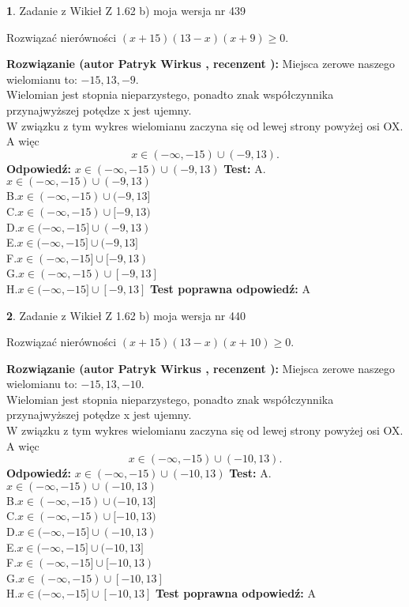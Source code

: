 \documentclass[12pt, a4paper]{article}
\theoremstyle{definition} %
\newtheorem{zad}{}
\newcommand{\zadStart}[1]{\begin{zad}#1\newline}
\newcommand{\zadStop}{\end{zad}}
\newcommand{\rozwStart}[2]{\noindent \textbf{Rozwiązanie (autor #1 , recenzent #2): }\newline}
\newcommand{\rozwStop}{\newline}
\newcommand{\odpStart}{\noindent \textbf{Odpowiedź:}\newline}
\newcommand{\odpStop}{\newline}
\newcommand{\testStart}{\noindent \textbf{Test:}\newline}
\newcommand{\testStop}{\newline}
\newcommand{\kluczStart}{\noindent \textbf{Test poprawna odpowiedź:}\newline}
\newcommand{\kluczStop}{\newline}
\begin{document}
\zadStart{Zadanie z Wikieł Z 1.62 b) moja wersja nr 439}

Rozwiązać nierówności $(x+15)(13-x)(x+9)\ge0$.
\zadStop
\rozwStart{Patryk Wirkus}{}
Miejsca zerowe naszego wielomianu to: $-15, 13, -9$.\\
Wielomian jest stopnia nieparzystego, ponadto znak współczynnika przy\linebreak najwyższej potędze x jest ujemny.\\ W związku z tym wykres wielomianu zaczyna się od lewej strony powyżej osi OX. A więc $$x \in (-\infty,-15) \cup (-9,13).$$
\rozwStop
\odpStart
$x \in (-\infty,-15) \cup (-9,13)$
\odpStop
\testStart
A.$x \in (-\infty,-15) \cup (-9,13)$\\
B.$x \in (-\infty,-15) \cup (-9,13]$\\
C.$x \in (-\infty,-15) \cup [-9,13)$\\
D.$x \in (-\infty,-15] \cup (-9,13)$\\
E.$x \in (-\infty,-15] \cup (-9,13]$\\
F.$x \in (-\infty,-15] \cup [-9,13)$\\
G.$x \in (-\infty,-15) \cup [-9,13]$\\
H.$x \in (-\infty,-15] \cup [-9,13]$
\testStop
\kluczStart
A
\kluczStop



\zadStart{Zadanie z Wikieł Z 1.62 b) moja wersja nr 440}

Rozwiązać nierówności $(x+15)(13-x)(x+10)\ge0$.
\zadStop
\rozwStart{Patryk Wirkus}{}
Miejsca zerowe naszego wielomianu to: $-15, 13, -10$.\\
Wielomian jest stopnia nieparzystego, ponadto znak współczynnika przy\linebreak najwyższej potędze x jest ujemny.\\ W związku z tym wykres wielomianu zaczyna się od lewej strony powyżej osi OX. A więc $$x \in (-\infty,-15) \cup (-10,13).$$
\rozwStop
\odpStart
$x \in (-\infty,-15) \cup (-10,13)$
\odpStop
\testStart
A.$x \in (-\infty,-15) \cup (-10,13)$\\
B.$x \in (-\infty,-15) \cup (-10,13]$\\
C.$x \in (-\infty,-15) \cup [-10,13)$\\
D.$x \in (-\infty,-15] \cup (-10,13)$\\
E.$x \in (-\infty,-15] \cup (-10,13]$\\
F.$x \in (-\infty,-15] \cup [-10,13)$\\
G.$x \in (-\infty,-15) \cup [-10,13]$\\
H.$x \in (-\infty,-15] \cup [-10,13]$
\testStop
\kluczStart
A
\kluczStop
\end{document}
